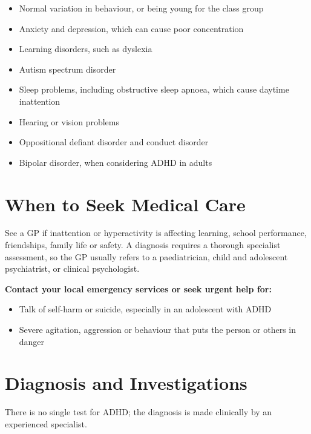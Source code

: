 \begin{itemize}
    \item Normal variation in behaviour, or being young for the class group
    \item Anxiety and depression, which can cause poor concentration
    \item Learning disorders, such as dyslexia
    \item Autism spectrum disorder
    \item Sleep problems, including obstructive sleep apnoea, which cause daytime inattention
    \item Hearing or vision problems
    \item Oppositional defiant disorder and conduct disorder
    \item Bipolar disorder, when considering ADHD in adults
\end{itemize}

\section*{When to Seek Medical Care}
See a GP if inattention or hyperactivity is affecting learning, school performance, friendships, family life or safety. A diagnosis requires a thorough specialist assessment, so the GP usually refers to a paediatrician, child and adolescent psychiatrist, or clinical psychologist.

\textbf{Contact your local emergency services or seek urgent help for:}
\begin{itemize}
    \item Talk of self-harm or suicide, especially in an adolescent with ADHD
    \item Severe agitation, aggression or behaviour that puts the person or others in danger
\end{itemize}

\section*{Diagnosis and Investigations}
There is no single test for ADHD; the diagnosis is made clinically by an experienced specialist.

